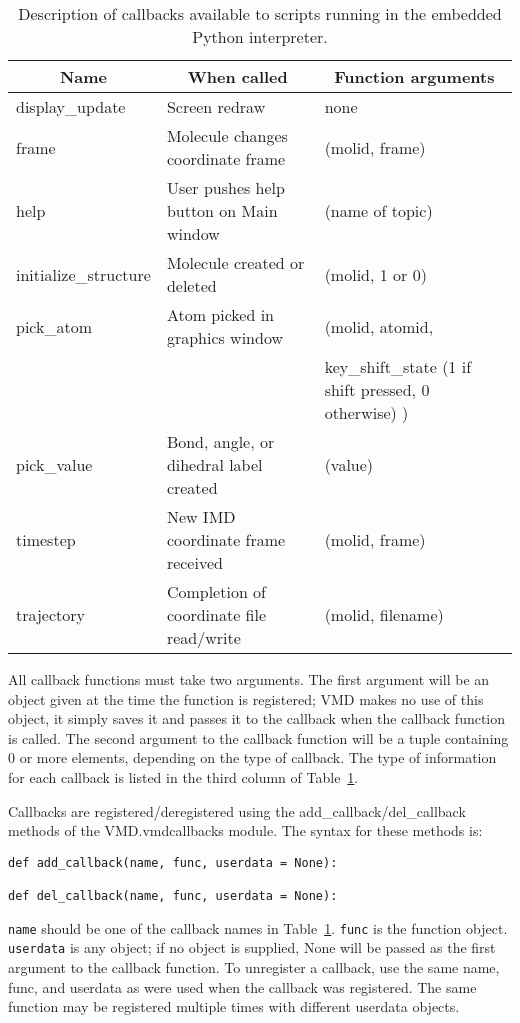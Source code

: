 \begin{table}[htb]
\label{table:ug:pythoncallbacks}
\caption{Description of callbacks available to scripts running in the 
embedded Python interpreter.}
\begin{tabular}{|l|l|l|} \hline
	\multicolumn{1}{|c}{Name} & 
	\multicolumn{1}{|c|}{When called} &
	\multicolumn{1}{|c|}{Function arguments}
	\\ \hline\hline

display\_update & Screen redraw & none \\
frame           & Molecule changes coordinate frame & (molid, frame) \\
help            & User pushes help button on Main window & (name of topic) \\
initialize\_structure & Molecule created or deleted & (molid, 1 or 0) \\
pick\_atom      & Atom picked in graphics window & (molid, atomid, \\
                &                                & key\_shift\_state (1 if shift pressed, 0 otherwise) ) \\
pick\_value     & Bond, angle, or dihedral label created & (value) \\
timestep        & New IMD coordinate frame received & (molid, frame) \\
trajectory      & Completion of coordinate file read/write & (molid, filename)\\

\hline
\end{tabular}
\end{table}

All callback functions must take two arguments.  The first
argument will be an object given at the time the function is registered;
VMD makes no use of this object, it simply saves it and passes it to the
callback when the callback function is called.  The second argument to the
callback function will be a tuple containing 0 or more elements, depending
on the type of callback.  The type of information for each callback is listed
in the third column of Table~\ref{table:ug:pythoncallbacks}.

Callbacks are registered/deregistered using the add\_callback/del\_callback
methods of the VMD.vmdcallbacks module.  The syntax for these methods is:
\begin{verbatim}
def add_callback(name, func, userdata = None):

def del_callback(name, func, userdata = None):
\end{verbatim}
{\tt name} should be one of the callback names in 
Table~\ref{table:ug:pythoncallbacks}.  {\tt func} is the function object.
{\tt userdata} is any object; if no object is supplied, None will be passed
as the first argument to the callback function.  To unregister a callback,
use the same name, func, and userdata as were used when the callback was
registered.  The same function may be registered multiple times with different
userdata objects.

